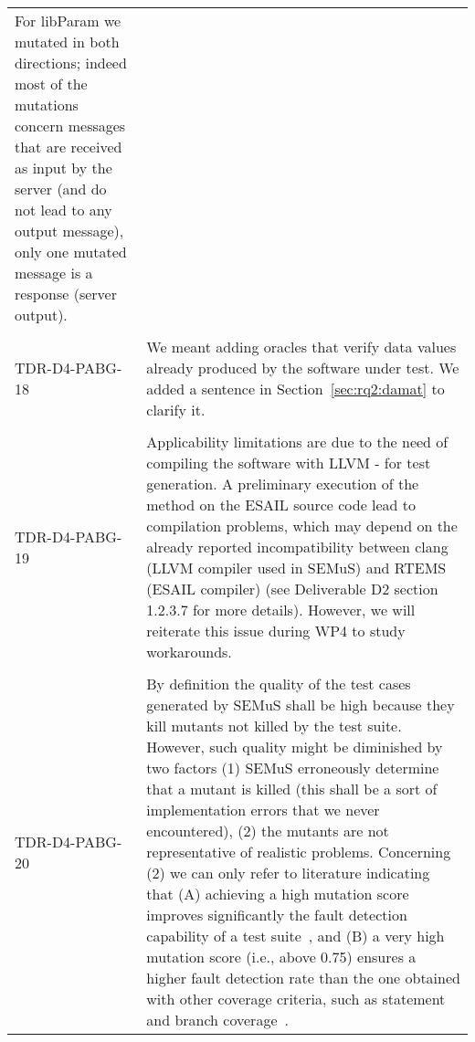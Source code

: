 \begin{longtable}{|p{2cm}|p{12cm}|@{}}
\begin{minipage}{12cm}
For libParam we mutated in both directions; indeed most of the mutations concern messages that are received as input by the server (and do not lead to any output message), only one mutated message is a response (server output).
\end{minipage}\\
\\
\hline
TDR-D4-PABG-18&
\begin{minipage}{12cm}
We meant adding oracles that verify data values already produced by the software under test. We added a sentence in Section~\ref{sec:rq2:damat} to clarify it.
\end{minipage}\\
\\
\hline
TDR-D4-PABG-19&
\begin{minipage}{12cm}
Applicability limitations are due to the need of compiling the software with LLVM - for test generation. A preliminary execution of the method on the ESAIL source code lead to compilation problems, which may depend on the already reported incompatibility between clang (LLVM compiler used in SEMuS) and RTEMS (ESAIL compiler) (see Deliverable D2 section 1.2.3.7 for more details).
However, we will reiterate this issue during WP4 to study workarounds.
\end{minipage}\\
\\
\hline
TDR-D4-PABG-20&
\begin{minipage}{12cm}
By definition the quality of the test cases generated by SEMuS shall be high because they kill mutants not killed by the test suite. However, such quality might be diminished by two factors (1) SEMuS erroneously determine that a mutant is killed (this shall be a sort of implementation errors that we never encountered), (2) the mutants are not representative of realistic problems. Concerning (2) we can only refer to literature indicating that (A) achieving a high mutation score improves significantly the fault detection capability of a test suite~\cite{papadakis2018mutation}, and (B) a very high mutation score (i.e., above 0.75) ensures a higher fault detection rate than the one obtained with other coverage criteria, such as statement and branch coverage~\cite{Chekam:17}.

\end{minipage}
\end{longtable}
